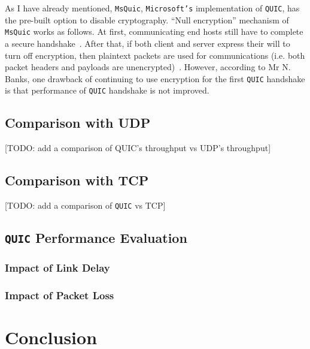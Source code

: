 \documentclass[12pt,a4paper,twoside,openright]{report}
\begin{document}
As I have already mentioned, \texttt{MsQuic}, \texttt{Microsoft's} implementation of \texttt{QUIC}, has the pre-built option to disable cryptography.
\enquote{Null encryption} mechanism of  \texttt{MsQuic} works as follows.
At first, communicating end hosts still have to complete a secure handshake~\cite{banks-quic-disable-encryption-00}.
After that, if both client and server express their will to turn off encryption, then plaintext packets are used for communications (i.e. both packet headers and payloads are unencrypted)~\cite{banks-quic-disable-encryption-00}.
However, according to Mr N. Banks, one drawback of continuing to use encryption for the first \texttt{QUIC} handshake is that performance of \texttt{QUIC} handshake is not improved.



\section{Comparison with UDP}
[TODO: add a comparison of QUIC's throughput vs UDP's throughput]


\section{Comparison with TCP}
[TODO: add a comparison of \texttt{QUIC} vs TCP]





\section{\texttt{QUIC} Performance Evaluation}


\subsection{Impact of Link Delay}



\subsection{Impact of Packet Loss}


\chapter{Conclusion}
\end{document}
